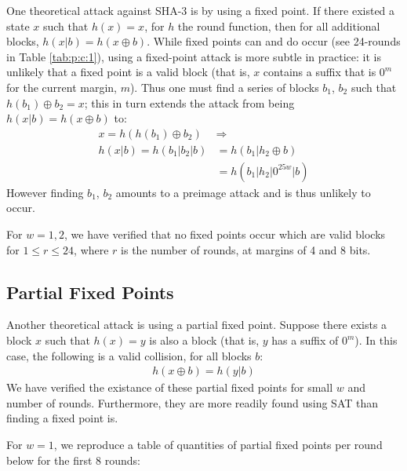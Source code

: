\documentclass[10pt,twocolumn,twoside]{pnas-new}
\begin{document}

One theoretical attack against SHA-3 is by using a fixed point. If there
existed a state $x$ such that $h(x) = x$, for $h$ the round function, then
for all additional blocks, $h(x | b) = h(x \oplus b)$. While fixed points can
and do occur (see 24-rounds in Table \ref{tab:p:c:1}), using a fixed-point
attack is more subtle in practice: it is unlikely that a fixed point is a valid
block (that is, $x$ contains a suffix that is $0^{m}$ for the current margin,
$m$). Thus one must find a series of blocks $b_1$, $b_2$ such that
$h(b_1) \oplus b_2 = x$; this in turn extends the attack from being
$h(x | b) = h(x \oplus b)$ to:
\begin{align*}
    x = h(h(b_1) \oplus b_2) & \Rightarrow \\
    h(x | b) = h(b_1 | b_2 | b) & = h(b_1 | h_2 \oplus b) \\
    & = h(b_1 | h_2 | 0^{25w} | b)
\end{align*}
However finding $b_1$, $b_2$ amounts to a preimage attack and is thus unlikely
to occur.

For $w=1, 2$, we have verified that no fixed points occur which are valid blocks
for $1 \leq r \leq 24$, where $r$ is the number of rounds, at margins of 4 and
8 bits.




\subsection{Partial Fixed Points} \label{sec:f:partial}

Another theoretical attack is using a partial fixed point. Suppose there
exists a block $x$ such that $h(x) = y$ is also a block (that is, $y$ has
a suffix of $0^{m}$). In this case, the following is a valid collision,
for all blocks $b$:
\begin{align*}
    h(x \oplus b) = h(y | b)
\end{align*}
We have verified the existance of these partial fixed points for small
$w$ and number of rounds. Furthermore, they are more readily found using SAT
than finding a fixed point is.

For $w=1$, we reproduce a table of quantities of partial fixed points per round
below for the first 8 rounds:
\end{document}
